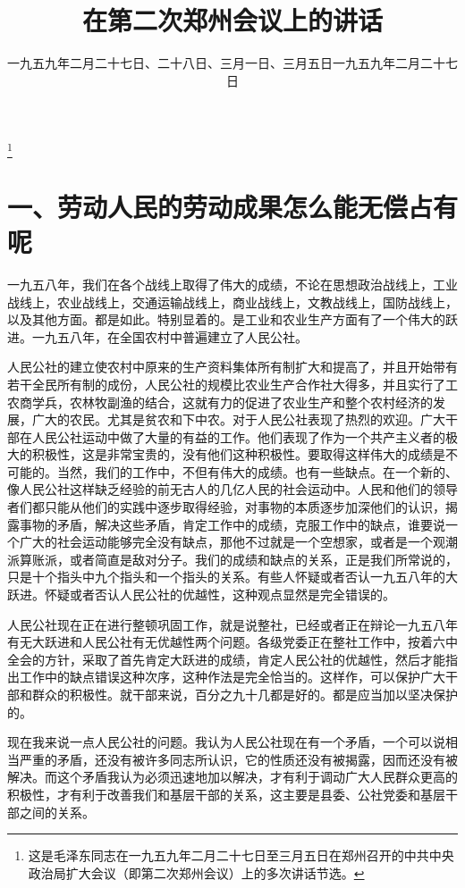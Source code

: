 
\title{在第二次郑州会议上的讲话}
\date{一九五九年二月二十七日、二十八日、三月一日、三月五日}
\thanks{这是毛泽东同志在一九五九年二月二十七日至三月五日在郑州召开的中共中央政治局扩大会议（即第二次郑州会议）上的多次讲话节选。}
\maketitle


\date{一九五九年二月二十七日}
\section{一、劳动人民的劳动成果怎么能无偿占有呢}

一九五八年，我们在各个战线上取得了伟大的成绩，不论在思想政治战线上，工业战线上，农业战线上，交通运输战线上，商业战线上，文教战线上，国防战线上，以及其他方面。都是如此。特别显着的。是工业和农业生产方面有了一个伟大的跃进。一九五八年，在全国农村中普遍建立了人民公社。

人民公社的建立使农村中原来的生产资料集体所有制扩大和提高了，并且开始带有若干全民所有制的成份，人民公社的规模比农业生产合作社大得多，并且实行了工农商学兵，农林牧副渔的结合，这就有力的促进了农业生产和整个农村经济的发展，广大的农民。尤其是贫农和下中农。对于人民公社表现了热烈的欢迎。广大干部在人民公社运动中做了大量的有益的工作。他们表现了作为一个共产主义者的极大的积极性，这是非常宝贵的，没有他们这种积极性。要取得这样伟大的成绩是不可能的。当然，我们的工作中，不但有伟大的成绩。也有一些缺点。在一个新的、像人民公社这样缺乏经验的前无古人的几亿人民的社会运动中。人民和他们的领导者们都只能从他们的实践中逐步取得经验，对事物的本质逐步加深他们的认识，揭露事物的矛盾，解决这些矛盾，肯定工作中的成绩，克服工作中的缺点，谁要说一个广大的社会运动能够完全没有缺点，那他不过就是一个空想家，或者是一个观潮派算账派，或者简直是敌对分子。我们的成绩和缺点的关系，正是我们所常说的，只是十个指头中九个指头和一个指头的关系。有些人怀疑或者否认一九五八年的大跃进。怀疑或者否认人民公社的优越性，这种观点显然是完全错误的。

人民公社现在正在进行整顿巩固工作，就是说整社，已经或者正在辩论一九五八年有无大跃进和人民公社有无优越性两个问题。各级党委正在整社工作中，按着六中全会的方针，采取了首先肯定大跃进的成绩，肯定人民公社的优越性，然后才能指出工作中的缺点错误这种次序，这种作法是完全恰当的。这样作，可以保护广大干部和群众的积极性。就干部来说，百分之九十几都是好的。都是应当加以坚决保护的。

现在我来说一点人民公社的问题。我认为人民公社现在有一个矛盾，一个可以说相当严重的矛盾，还没有被许多同志所认识，它的性质还没有被揭露，因而还没有被解决。而这个矛盾我认为必须迅速地加以解决，才有利于调动广大人民群众更高的积极性，才有利于改善我们和基层干部的关系，这主要是县委、公社党委和基层干部之间的关系。

